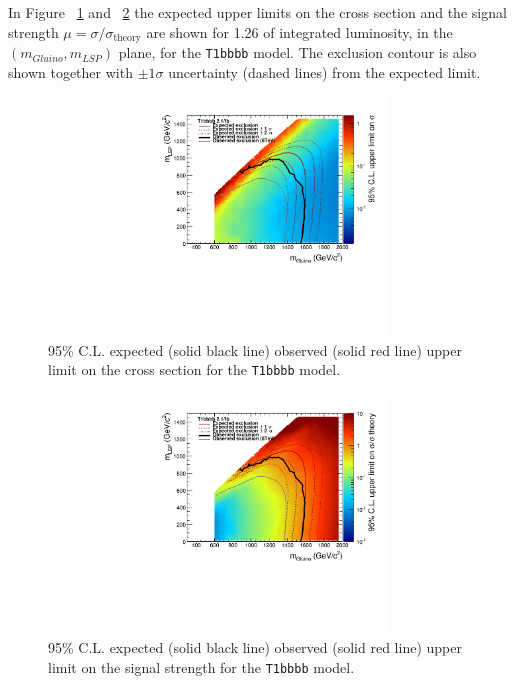 
In Figure ~\ref{fig:T1bbbb_plane_xs} and ~\ref{fig:T1bbbb_plane_mu} the expected upper limits on the cross section and the signal strength $\mu=\sigma/\sigma_{\mathrm{theory}}$ are shown for 1.26 \ifb of integrated luminosity, in the $(m_{Gluino},m_{LSP})$ plane, for the \texttt{T1bbbb} model. 
The exclusion contour is also shown together with $\pm1\sigma$ uncertainty (dashed lines) from the expected limit. 

\begin{figure}
  \caption{95\% C.L. expected (solid black line) observed (solid red line) upper limit on the cross section for the \texttt{T1bbbb} model.\label{fig:T1bbbb_plane_xs}}
  \begin{center}
    \includegraphics[width=0.8\textwidth]{figures/susyResults/xs_contour_withHisto}
  \end{center}
\end{figure}

\begin{figure}
  \caption{95\% C.L. expected (solid black line) observed (solid red line) upper limit on the signal strength for the \texttt{T1bbbb} model.\label{fig:T1bbbb_plane_mu}}
  \begin{center}
    \includegraphics[width=0.8\textwidth]{figures/susyResults/mu_contour_withHisto}
  \end{center}
\end{figure}


